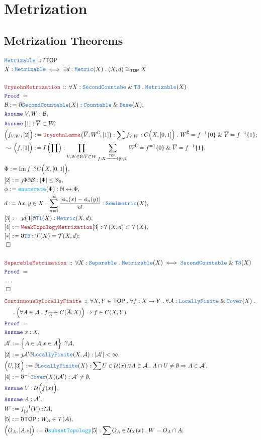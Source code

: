 \documentclass[12pt]{scrartcl}
\newcommand{\TYPE}[1]{\textcolor{NavyBlue}{\mathtt{#1}}}
\newcommand{\FUNC}[1]{\textcolor{Cerulean}{\mathtt{#1}}}
\newcommand{\LOGIC}[1]{\textcolor{Blue}{\mathtt{#1}}}
\newcommand{\THM}[1]{\textcolor{Maroon}{\mathtt{#1}}}
\renewcommand{\.}{\; . \;}
\newcommand{\de}{: \kern 0.1pc =}
\newcommand{\Act}[1]{\left( #1 \right)}
\newcommand{\Theorem}[2]{& \THM{#1} \, :: \, #2 \\ & \Proof = \\ }
\newcommand{\DeclareType}[2]{& \TYPE{#1} \, :: \, #2 \\}
\newcommand{\DefineType}[3]{& #1 : \TYPE{#2} \iff #3 \\}
\newcommand{\NewLine}{\\ & \kern 1pc}
\newcommand{\Page}[1]{ \begin{align*} #1 \end{align*}   }
\newcommand{ \bd }{ \ByDef }
\newcommand{\NoProof}{ & \ldots \\ \EndProof}
\renewcommand{\And}{\; \& \;}
\newcommand{\Imply}{\Rightarrow}
\newcommand{\Nat}{\mathbb{N} }
\DeclareMathOperator*{\im}{Im}
\newcommand{\ToBij}{\leftrightarrow}
\newcommand{\Arrow}{\xrightarrow}
\renewcommand{\c}{\complement}
\newcommand{\Say}[3]{& #1 \de #2 : #3, \\}
\newcommand{\Conclude}[3]{& #1 \de #2 : #3; \\}
\newcommand{\Derive}[3]{& \leadsto #1 \de #2 : #3, \\}
\newcommand{\Assume}[2]{& \LOGIC{Assume} \; #1 : #2, \\}
\newcommand{\QED}{\; \square}
\newcommand{\EndProof}{& \QED \\}
\newcommand{\ByDef}{\eth}
\newcommand{\ByConstr}{\jmath}
\newcommand{\Proof}{\LOGIC{Proof} \; }
\newcommand{\A}{\mathcal{A}}
\newcommand{\B}{\mathcal{B}}
\newcommand{\TOP}{\mathsf{TOP}}
\newcommand{\T}{\mathcal{T}}
\renewcommand{\U}{\mathcal{U}}
\begin{document}
\section{Metrization}
\subsection{Metrization Theorems}
\Page{
	\DeclareType{Metrizable}{?\TOP}
	\DefineType{X}{Metrizable}{\exists d : \TYPE{Metric}(X) \. (X,d) \cong_{\TOP} X}
	\\
	\Theorem{UrysohnMetrization}{\forall X : \TYPE{SecondCountabe} \And \TYPE{T3} \. \TYPE{Metrizable}(X)}
	\Say{\mathcal{B}}{\bd \TYPE{SecondCountable}(X)}{\TYPE{Countable} \And \TYPE{Base}(X)}
	\Assume{V,W}{\B}
	\Assume{[1]}{\overline{V} \subset W}
	\Conclude{\Big(f_{V,W},[2]\Big)}{\THM{UrysohnLemma}\big(\overline{V},W^\c,[1]\big)}{\sum f_{V,W} : C\Big(X,[0,1]\Big) \. W^\c =f^{-1}\{0\}  \And \overline{V} = f^{-1}\{1\}}
	\Derive{\Big(f,[1]\Big)}{I\Act{\prod}}{\prod_{V,W \in \B : \overline{V} \subset W} \sum_{f : X \Arrow{\TOP} [0,1]} W^\c = f^{=1}\{0\} \And  \overline{V} = f^{-1}\{1\}  }
	\Say{\Phi}{\im f}{?C\Big(X,[0,1]\Big)}
	\Say{[2]}{\ByConstr \Phi \bd \B}{|\Phi| \le \aleph_0}
	\Say{\phi}{\FUNC{enumerate}(\Phi)}{\Nat \ToBij \Phi}
	\Say{d}{\Lambda x,y \in X \. \sum^\infty_{n=1} \frac{|\phi_n(x) - \phi_n(y)|}{n!}}{\TYPE{Semimetric}(X)}
	\Say{[3]}{\ByConstr d [1] \bd \TYPE{T1}(X)}{\TYPE{Metric}(X,d)}
	\Say{[4]}{\THM{WeakTopologyMetrization}[3]}{ \T(X,d) \subset \T(X) }
	\Conclude{[*]}{\bd \TYPE{T3}}{\T(X) = \T(X,d)}
	\EndProof
	\\
	\Theorem{SeparableMetrization}{\forall X : \TYPE{Separable} \.  \TYPE{Metrizable}(X) \iff \TYPE{SecondCountable} \And \TYPE{T3}(X)   }
	\NoProof
}\Page{
	\Theorem{ContinuousByLocallyFinite}{
		\forall X,Y \in \TOP \. 
		\forall f : X \to Y \. 
		\forall \A : \TYPE{LocallyFinite} \And \TYPE{Cover}(X) \. \NewLine \.
		\Big( \forall A \in \A \. f_{|\overline{A}} \in C(\overline{A},X) \Big) \Imply
		f \in C(X,Y)
	}
	\Assume{x}{X}
	\Say{\A'}{\Big\{ A \in \A |  x \in A  \Big\}}{?\A}
	\Say{[2]}{\ByConstr \A' \bd  \TYPE{LocallyFinite}(X,\A)}{|\A'| < \infty}
	\Say{\Big(U,[3]\Big)}{\bd \TYPE{LocallyFinite}(X)}{\sum U \in \U(x) . \forall  A \in \A \. A \cap U \neq \emptyset \Imply A \in \A'  }
	\Say{[4]}{\bd^{-1} \TYPE{Cover}(X)(\A')}{\A' \neq \emptyset}
	\Assume{V}{\U\Big(f(x)\Big)}
	\Assume{A}{\A'}
	\Say{W}{f_{|A}^{-1}(V)}{?A}
	\Say{[5]}{\bd \TOP}{W_A  \in \T(A) }
	\Conclude{\Big(O_A,[A.*] \Big)}{\bd \FUNC{subsetTopology}[5]}{ \sum O_A \in \U_X(x) \. W = O_A \cap A }
}
\end{document}
